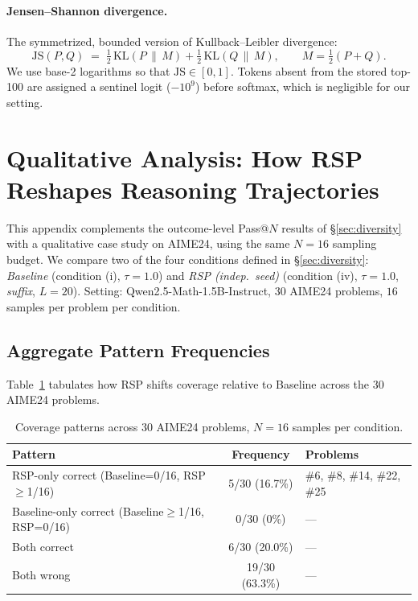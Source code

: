\paragraph{Jensen--Shannon divergence.}
The symmetrized, bounded version of Kullback--Leibler divergence:
\begin{equation}
\mathrm{JS}(P, Q) \;=\; \tfrac{1}{2}\,\mathrm{KL}(P \,\|\, M) + \tfrac{1}{2}\,\mathrm{KL}(Q \,\|\, M), \qquad M = \tfrac{1}{2}(P + Q).
\end{equation}
We use base-2 logarithms so that $\mathrm{JS} \in [0, 1]$. Tokens absent from the stored top-100 are assigned a sentinel logit ($-10^9$) before softmax, which is negligible for our setting.

\section{Qualitative Analysis: How RSP Reshapes Reasoning Trajectories}\label{app:qualitative}

This appendix complements the outcome-level Pass@$N$ results of \S\ref{sec:diversity} with a qualitative case study on AIME24, using the same $N{=}16$ sampling budget. We compare two of the four conditions defined in \S\ref{sec:diversity}: \emph{Baseline} (condition (i), $\tau{=}1.0$) and \emph{RSP (indep.\ seed)} (condition (iv), $\tau{=}1.0$, \emph{suffix}, $L{=}20$). Setting: Qwen2.5-Math-1.5B-Instruct, 30 AIME24 problems, $16$ samples per problem per condition.

\subsection{Aggregate Pattern Frequencies}\label{app:qualitative_stats}

Table~\ref{tab:qualitative_patterns} tabulates how RSP shifts coverage relative to Baseline across the 30 AIME24 problems.

\begin{table}[H]
\centering
\caption{Coverage patterns across 30 AIME24 problems, $N{=}16$ samples per condition.}
\label{tab:qualitative_patterns}
\footnotesize
\renewcommand{\arraystretch}{0.95}
\begin{tabular}{lcl}
\toprule
\textbf{Pattern} & \textbf{Frequency} & \textbf{Problems} \\
\midrule
RSP-only correct (Baseline=0/16, RSP$\ge$1/16) & 5/30 (16.7\%) & \#6, \#8, \#14, \#22, \#25 \\
Baseline-only correct (Baseline$\ge$1/16, RSP=0/16) & 0/30 \;\;(0\%) & --- \\
Both correct                          & 6/30 (20.0\%)  & --- \\
Both wrong                            & 19/30 (63.3\%) & --- \\
\bottomrule
\end{tabular}
\end{table}

